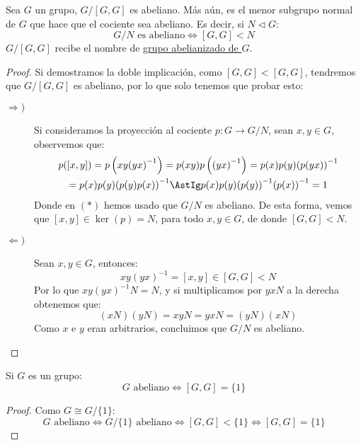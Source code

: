 \begin{prop}\label{prop:abelianizado}
    Sea $G$ un grupo, $G/[G,G]$ es abeliano. Más aún, es el menor subgrupo normal de $G$ que hace que el cociente sea abeliano. Es decir, si $N\lhd G$:
    \begin{equation*}
        G/N \text{\ es abeliano} \Longleftrightarrow [G,G] < N
    \end{equation*}
    $G/[G,G]$ recibe el nombre de \underline{grupo abelianizado de $G$}.
    \begin{proof}
        Si demostramos la doble implicación, como $[G,G] < [G,G]$, tendremos que $G/[G,G]$ es abeliano, por lo que solo tenemos que probar esto:
        \begin{description}
            \item [$\Longrightarrow)$] Si consideramos la proyección al cociente $p:G\to G/N$, sean $x,y\in G$, observemos que:
                \begin{multline*}
                    p([x,y]) = p\left(xy{(yx)}^{-1}\right) = p(xy)p\left({(yx)}^{-1}\right) = p(x)p(y){(p(yx))}^{-1} \\ = p(x) p(y) {(p(y)p(x))}^{-1} \AstIg p(x)p(y) {(p(y))}^{-1}{(p(x))}^{-1} = 1
                \end{multline*}
                Donde en $(\ast)$ hemos usado que $G/N$ es abeliano. De esta forma, vemos que $[x,y]\in \ker(p) = N$, para todo $x,y\in G$, de donde $[G,G] < N$.
            \item [$\Longleftarrow)$] Sean $x,y\in G$, entonces:
                \begin{equation*}
                    xy{(yx)}^{-1} = [x,y] \in [G,G] < N
                \end{equation*}
                Por lo que $xy{(yx)}^{-1}N = N$, y si multiplicamos por $yxN$ a la derecha obtenemos que:
                \begin{equation*}
                    (xN)(yN) = xyN = yxN = (yN)(xN)
                \end{equation*}
                Como $x$ e $y$ eran arbitrarios, concluimos que $G/N$ es abeliano.
        \end{description}
    \end{proof}
\end{prop}

\begin{coro}
    Si $G$ es un grupo:
    \begin{equation*}
        G \text{\ abeliano} \Longleftrightarrow [G,G] = \{1\}
    \end{equation*}
    \begin{proof}
        Como $G\cong G/\{1\}$:
        \begin{equation*}
            G \text{\ abeliano} \Longleftrightarrow G/\{1\} \text{\ abeliano} \Longleftrightarrow [G,G] < \{1\} \Longleftrightarrow [G,G] = \{1\}
        \end{equation*}
    \end{proof}
\end{coro}

